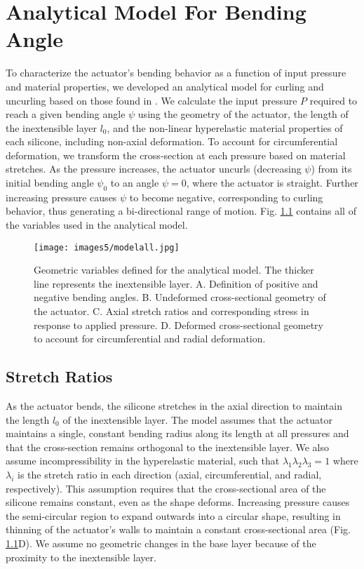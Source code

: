 \chapter{Analytical Model For Bending Angle}
\label{chapter:model}

To characterize the actuator's bending behavior as a function of input pressure and material properties, we developed an analytical model for curling and uncurling based on those found in \cite{polygerinos_modeling_2015, connolly_automatic_2017, hu_precurved_2022}. We calculate the input pressure $P$ required to reach a given bending angle $\psi$ using the geometry of the actuator, the length of the inextensible layer $l_0$, and the non-linear hyperelastic material properties of each silicone, including non-axial deformation. To account for circumferential deformation, we transform the cross-section at each pressure based on material stretches. As the pressure increases, the actuator uncurls (decreasing $\psi$) from its initial bending angle $\psi_0$ to an angle $\psi=0$, where the actuator is straight. Further increasing pressure causes $\psi$ to become negative, corresponding to curling behavior, thus generating a bi-directional range of motion. Fig. \ref{fig:modelall} contains all of the variables used in the analytical model. 

\begin{figure}[ht]
    \centering
     \texttt{[image: images5/modelall.jpg]}
    \caption{Geometric variables defined for the analytical model. The thicker line represents the inextensible layer. A. Definition of positive and negative bending angles. B. Undeformed cross-sectional geometry of the actuator. C. Axial stretch ratios and corresponding stress in response to applied pressure. D. Deformed cross-sectional geometry to account for circumferential and radial deformation.}
    \label{fig:modelall}
\end{figure}

\clearpage
\section{Stretch Ratios}

As the actuator bends, the silicone stretches in the axial direction to maintain the length $l_0$ of the inextensible layer. The model assumes that the actuator maintains a single, constant bending radius along its length at all pressures and that the cross-section remains orthogonal to the inextensible layer. We also assume incompressibility in the hyperelastic material, such that $\lambda_{1}\lambda_{2}\lambda_{3} = 1$ where $\lambda_i$ is the stretch ratio in each direction (axial, circumferential, and radial, respectively). This assumption requires that the cross-sectional area of the silicone remains constant, even as the shape deforms. Increasing pressure causes the semi-circular region to expand outwards into a circular shape, resulting in thinning of the actuator's walls to maintain a constant cross-sectional area (Fig. \ref{fig:modelall}D). We assume no geometric changes in the base layer because of the proximity to the inextensible layer.

